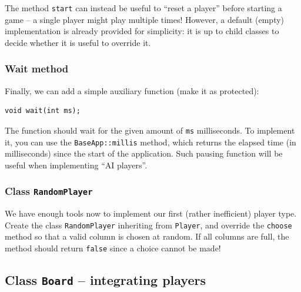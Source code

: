 \documentclass{article}
\begin{document}
The method \texttt{start} can instead be useful to ``reset a player'' before starting a game -- a single player might play multiple times! However, a default (empty) implementation is already provided for simplicity: it is up to child classes to decide whether it is useful to override it.



\subsubsection{Wait method}

Finally, we can add a simple auxiliary function (make it as protected):
\begin{center}
\begin{minipage}{.9\textwidth}
\begin{lstlisting}[style=mycpp,numbers=none]
void wait(int ms);
\end{lstlisting}
\end{minipage}
\end{center}
The function should wait for the given amount of \texttt{ms} milliseconds. To implement it, you can use the \texttt{BaseApp}\texttt{::}\texttt{millis} method, which returns the elapsed time (in milliseconds) since the start of the application. Such pausing function will be useful when implementing ``AI players''.



\subsubsection{Class \texttt{RandomPlayer}}

We have enough tools now to implement our first (rather inefficient) player type. Create the class \texttt{RandomPlayer} inheriting from \texttt{Player}, and override the \texttt{choose} method so that a valid column is chosen at random. If all columns are full, the method should return \texttt{false} since a choice cannot be made!






\subsection{Class \texttt{Board} -- integrating players}
\end{document}
